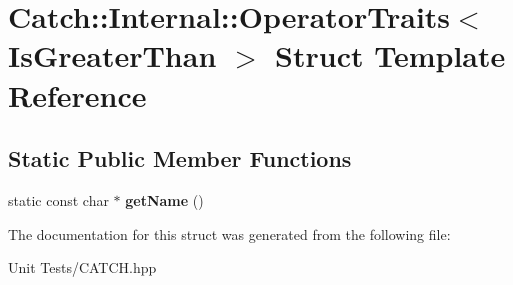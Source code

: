 \hypertarget{structCatch_1_1Internal_1_1OperatorTraits_3_01IsGreaterThan_01_4}{}\section{Catch\+:\+:Internal\+:\+:Operator\+Traits$<$ Is\+Greater\+Than $>$ Struct Template Reference}
\label{structCatch_1_1Internal_1_1OperatorTraits_3_01IsGreaterThan_01_4}
\subsection*{Static Public Member Functions}
\begin{DoxyCompactItemize}
\item 
static const char $\ast$ {\bfseries get\+Name} ()\hypertarget{structCatch_1_1Internal_1_1OperatorTraits_3_01IsGreaterThan_01_4_ab917bfb9ccbe461dc684ee5a34d67d27}{}\label{structCatch_1_1Internal_1_1OperatorTraits_3_01IsGreaterThan_01_4_ab917bfb9ccbe461dc684ee5a34d67d27}

\end{DoxyCompactItemize}


The documentation for this struct was generated from the following file\+:\begin{DoxyCompactItemize}
\item 
Unit Tests/C\+A\+T\+C\+H.\+hpp\end{DoxyCompactItemize}
